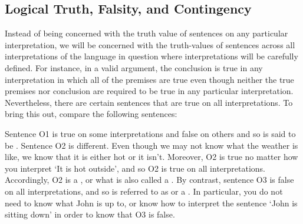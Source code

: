 \subsection{Logical Truth, Falsity, and Contingency}
\label{sec-tautologydef}

Instead of being concerned with the truth value of sentences on any particular interpretation, we will be concerned with the truth-values of sentences across all interpretations of the language in question where interpretations will be carefully defined.
For instance, in a valid argument, the conclusion is true in any interpretation in which all of the premises are true even though neither the true premises nor conclusion are required to be true in any particular interpretation.
Nevertheless, there are certain sentences that are true on all interpretations.
To bring this out, compare the following sentences:

\begin{earg}
\end{earg}

Sentence O1 is true on some interpretations and false on others and so is said to be .
Sentence O2 is different.
Even though we may not know what the weather is like, we know that it is either hot or it isn't.
Moreover, O2 is true no matter how you interpret `It is hot outside', and so O2 is true on all interpretations.
Accordingly, O2 is a , or what is also called a .
By contrast, sentence O3 is false on all interpretations, and so is referred to as  or a .
In particular, you do not need to know what John is up to, or know how to interpret the sentence `John is sitting down' in order to know that O3 is false.



